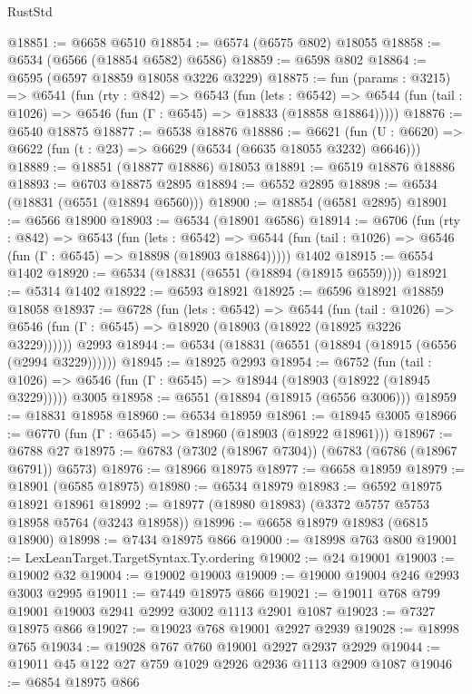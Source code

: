 \begin{lexlean}{RustStd}
\begin{coremodule}
@18851 := @6658 @6510
@18854 := @6574 (@6575 @802) @18055
@18858 := @6534 (@6566 (@18854 @6582) @6586)
@18859 := @6598 @802
@18864 := @6595 (@6597 @18859 @18058 @3226 @3229)
@18875 := fun (params : @3215) =>
  @6541
    (fun (rty : @842) =>
    @6543
      (fun (lets : @6542) =>
      @6544 (fun (tail : @1026) => @6546 (fun (Γ : @6545) => @18833 (@18858 @18864)))))
@18876 := @6540 @18875
@18877 := @6538 @18876
@18886 := @6621
    (fun (U : @6620) => @6622 (fun (t : @23) => @6629 (@6534 (@6635 @18055 @3232) @6646)))
@18889 := @18851 (@18877 @18886) @18053
@18891 := @6519 @18876 @18886
@18893 := @6703 @18875 @2895
@18894 := @6552 @2895
@18898 := @6534 (@18831 (@6551 (@18894 @6560)))
@18900 := @18854 (@6581 @2895)
@18901 := @6566 @18900
@18903 := @6534 (@18901 @6586)
@18914 := @6706
    (fun (rty : @842) =>
    @6543
      (fun (lets : @6542) =>
      @6544 (fun (tail : @1026) => @6546 (fun (Γ : @6545) => @18898 (@18903 @18864)))))
    @1402
@18915 := @6554 @1402
@18920 := @6534 (@18831 (@6551 (@18894 (@18915 @6559))))
@18921 := @5314 @1402
@18922 := @6593 @18921
@18925 := @6596 @18921 @18859 @18058
@18937 := @6728
    (fun (lets : @6542) =>
    @6544
      (fun (tail : @1026) =>
      @6546 (fun (Γ : @6545) => @18920 (@18903 (@18922 (@18925 @3226 @3229))))))
    @2993
@18944 := @6534 (@18831 (@6551 (@18894 (@18915 (@6556 (@2994 @3229))))))
@18945 := @18925 @2993
@18954 := @6752
    (fun (tail : @1026) => @6546 (fun (Γ : @6545) => @18944 (@18903 (@18922 (@18945 @3229)))))
    @3005
@18958 := @6551 (@18894 (@18915 (@6556 @3006)))
@18959 := @18831 @18958
@18960 := @6534 @18959
@18961 := @18945 @3005
@18966 := @6770 (fun (Γ : @6545) => @18960 (@18903 (@18922 @18961)))
@18967 := @6788 @27
@18975 := @6783 (@7302 (@18967 @7304)) (@6783 (@6786 (@18967 @6791)) @6573)
@18976 := @18966 @18975
@18977 := @6658 @18959
@18979 := @18901 (@6585 @18975)
@18980 := @6534 @18979
@18983 := @6592 @18975 @18921 @18961
@18992 := @18977 (@18980 @18983) (@3372 @5757 @5753 @18958 @5764 (@3243 @18958))
@18996 := @6658 @18979 @18983 (@6815 @18900)
@18998 := @7434 @18975 @866
@19000 := @18998 @763 @800
@19001 := LexLeanTarget.TargetSyntax.Ty.ordering
@19002 := @24 @19001
@19003 := @19002 @32
@19004 := @19002 @19003
@19009 := @19000 @19004 @246 @2993 @3003 @2995
@19011 := @7449 @18975 @866
@19021 := @19011 @768 @799 @19001 @19003 @2941 @2992 @3002 @1113 @2901 @1087
@19023 := @7327 @18975 @866
@19027 := @19023 @768 @19001 @2927 @2939
@19028 := @18998 @765
@19034 := @19028 @767 @760 @19001 @2927 @2937 @2929
@19044 := @19011 @45 @122 @27 @759 @1029 @2926 @2936 @1113 @2909 @1087
@19046 := @6854 @18975 @866

\end{coremodule}
\end{lexlean}
